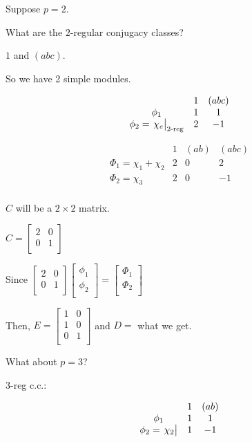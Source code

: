 \documentclass{article}
\theoremstyle{definition}
\begin{document}
Suppose \(p=2\).

What are the \(2\)-regular conjugacy classes?

\(1\) and \((abc)\).

So we have 2 simple modules.

\[
    \begin{array}{ccc}
            & 1 & (abc)\\
        \phi_1 & 1 & 1\\
        \phi_2 = \eval{\chi_e}_{2\text{-reg}} & 2 & -1 \\
    \end{array}
\]

\[
    \begin{array}{cccc}
         & 1 & (ab) & (abc) \\
        \Phi_1 = \chi_1 + \chi_2 & 2 & 0 & 2 \\
        \Phi_2 = \chi_3 & 2 & 0 & -1 \\
    \end{array}
\]

\(C\) will be a \(2 \times 2\) matrix.

\(C = \begin{bmatrix}
    2 & 0\\
    0 & 1\\
\end{bmatrix} \) 

Since \(\begin{bmatrix}
    2 & 0\\
    0 & 1\\
\end{bmatrix} \begin{bmatrix}
    \phi_1\\
    \phi_2\\
\end{bmatrix} = \begin{bmatrix}
    \Phi_1\\
    \Phi_2\\
\end{bmatrix} \) 

Then, \(E = \begin{bmatrix}
    1 & 0\\
    1 & 0\\
    0 & 1\\
\end{bmatrix} \) and \(D =\) what we get.

What about \(p=3\)?

\(3\)-reg c.c.:

\[
    \begin{array}{ccc}
         & 1 & (ab)\\
    \phi_1 & 1 & 1\\
    \phi_2 = \eval{\chi_2} & 1 & -1 \\
    \end{array}
\]
\end{document}
